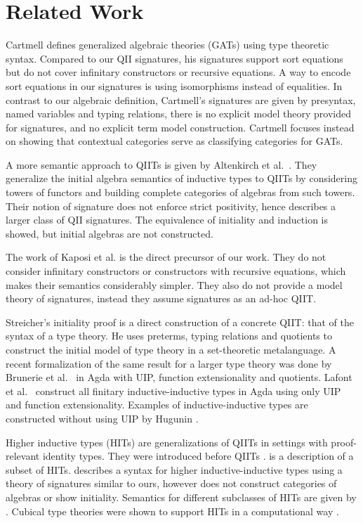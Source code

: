 \documentclass[sigplan,review,anonymous]{acmart}\settopmatter{printfolios=true,printccs=false,printacmref=false}
\begin{document}
\section{Related Work}
\label{sec:relatedwork}

Cartmell \cite{gat} defines generalized algebraic theories (GATs) using type
theoretic syntax. Compared to our QII signatures, his signatures support sort
equations but do not cover infinitary constructors or recursive equations. A way
to encode sort equations in our signatures is using isomorphisms instead of
equalities. In contrast to our algebraic definition, Cartmell's signatures are
given by presyntax, named variables and typing relations, there is no
explicit model theory provided for signatures, and no explicit term model
construction. Cartmell focuses instead on showing that contextual categories
serve as classifying categories for GATs.

A more semantic approach to QIITs is given by Altenkirch et al.\
\cite{gabe}. They generalize the initial algebra semantics of
inductive types to QIITs by considering towers of functors and
building complete categories of algebras from such towers. Their
notion of signature does not enforce strict positivity, hence
describes a larger class of QII signatures. The equivalence of
initiality and induction is showed, but initial algebras are not
constructed.

The work of Kaposi et al. \cite{kaposi2019constructing} is the direct precursor
of our work. They do not consider infinitary constructors or constructors with
recursive equations, which makes their semantics considerably simpler. They also
do not provide a model theory of signatures, instead they assume signatures as
an ad-hoc QIIT.

Streicher's initiality proof \cite{streicher2012semantics} is a direct
construction of a concrete QIIT: that of the syntax of a type theory. He uses
preterms, typing relations and quotients to construct the initial model of type
theory in a set-theoretic metalanguage. A recent formalization of the same
result for a larger type theory was done by Brunerie et al.\ \cite{brunerie} in
Agda with UIP, function extensionality and quotients. Lafont et
al.\ \cite{induction-is-enough} construct all finitary inductive-inductive types
in Agda using only UIP and function extensionality. Examples of
inductive-inductive types are constructed without using UIP by Hugunin
\cite{jasper}.

Higher inductive types (HITs) are generalizations of QIITs in settings with
proof-relevant identity types. They were introduced before QIITs
\cite{HoTTbook}. \cite{niels} is a description of a subset of HITs. \cite{hiit}
describes a syntax for higher inductive-inductive types using a theory of
signatures similar to ours, however does not construct categories of algebras or
show initiality. Semantics for different subclasses of HITs are given by
\cite{lumsdaineShulman,10.1145/3209108.3209130,nielsmsc,sojakova,moeneclaey}. Cubical
type theories were shown to support HITs in a computational way
\cite{niels,hiit}.
\end{document}
